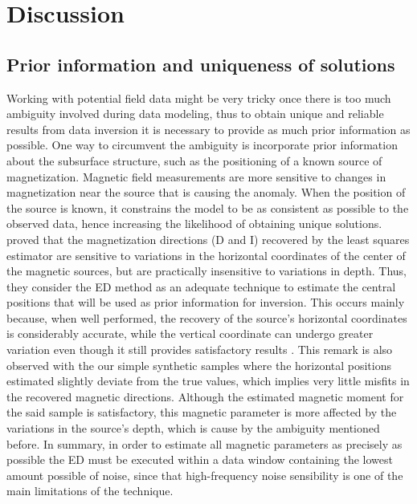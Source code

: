 \section{Discussion}

\subsection{Prior information and uniqueness of solutions}
Working with potential field data might be very tricky once there is too much ambiguity involved during data modeling, thus to obtain unique and reliable results from data inversion it is necessary to provide as much prior information as possible. One way to circumvent the ambiguity is incorporate prior information about the subsurface structure, such as the positioning of a known source of magnetization. Magnetic field measurements are more sensitive to changes in magnetization near the source that is causing the anomaly. When the position of the source is known, it constrains the model to be as consistent as possible to the observed data, hence increasing the likelihood of obtaining unique solutions. \citet{Oliveira2015Estimation} proved that the magnetization directions (D and I) recovered by the least squares estimator are sensitive to variations in the horizontal coordinates of the center of the magnetic sources, but are practically insensitive to variations in depth. Thus, they consider the ED method as an adequate technique to estimate the central positions that will be used as prior information for inversion. This occurs mainly because, when well performed, the recovery of the source's horizontal coordinates is considerably accurate, while the vertical coordinate can undergo greater variation even though it still provides satisfactory results \citep{Silva20033D, Melo2013}. This remark is also observed with the our simple synthetic samples where the horizontal positions estimated slightly deviate from the true values, which implies very little misfits in the recovered magnetic directions. Although the estimated magnetic moment for the said sample is satisfactory, this magnetic parameter is more affected by the variations in the source's depth, which is cause by the ambiguity mentioned before. In summary, in order to estimate all magnetic parameters as precisely as possible the ED must be executed within a data window containing the lowest amount possible of noise, since that high-frequency noise sensibility is one of the main limitations of the technique.

